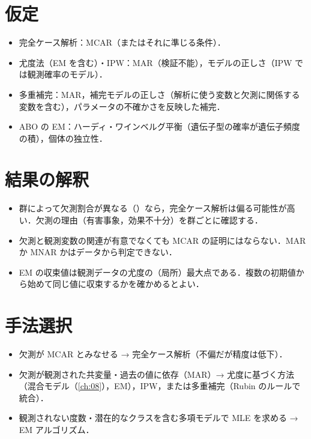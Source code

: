 \section{仮定}\label{sec:16-assump}
\begin{itemize}
\item 完全ケース解析：MCAR（またはそれに準じる条件）．
\item 尤度法（EM を含む）・IPW：MAR（検証不能），モデルの正しさ（IPW では観測確率のモデル）．
\item 多重補完：MAR，補完モデルの正しさ（解析に使う変数と欠測に関係する変数を含む），パラメータの不確かさを反映した補完．
\item ABO の EM：ハーディ・ワインベルグ平衡（遺伝子型の確率が遺伝子頻度の積），個体の独立性．
\end{itemize}

\section{結果の解釈}\label{sec:16-interp}
\begin{itemize}
\item 群によって欠測割合が異なる（）なら，完全ケース解析は偏る可能性が高い．欠測の理由（有害事象，効果不十分）を群ごとに確認する．
\item 欠測と観測変数の関連が有意でなくても MCAR の証明にはならない．MAR か MNAR かはデータから判定できない．
\item EM の収束値は観測データの尤度の（局所）最大点である．複数の初期値から始めて同じ値に収束するかを確かめるとよい．
\end{itemize}

\section{手法選択}\label{sec:16-choice}
\begin{itemize}
\item 欠測が MCAR とみなせる → 完全ケース解析（不偏だが精度は低下）．
\item 欠測が観測された共変量・過去の値に依存（MAR）→ 尤度に基づく方法（混合モデル（\cref{ch:08}），EM），IPW，または多重補完（Rubin のルールで統合）．
\item 観測されない度数・潜在的なクラスを含む多項モデルで MLE を求める → EM アルゴリズム．
\end{itemize}

